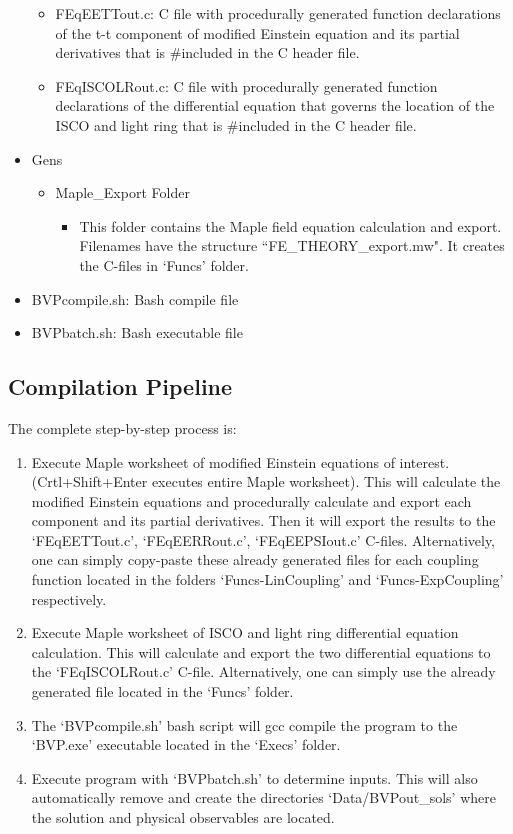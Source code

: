\documentclass{article}
\begin{document}
\begin{itemize}
\begin{itemize}
\item FEqEETTout.c:  C file with procedurally generated function declarations of the t-t component of modified Einstein equation and its partial derivatives that is \#included in the C header file.
\item FEqISCOLRout.c:  C file with procedurally generated function declarations of the differential equation that governs the location of the ISCO and light ring that is \#included in the C header file.
\end{itemize}
\item Gens
\begin{itemize}
\item Maple\_Export Folder
\begin{itemize}
\item This folder contains the Maple field equation calculation and export. Filenames have the structure ``FE\_THEORY\_export.mw". It creates the C-files in `Funcs' folder.
\end{itemize}
\end{itemize}
\item BVPcompile.sh: Bash compile file
\item BVPbatch.sh: Bash executable file
\end{itemize}



\subsection{Compilation Pipeline}
\label{ssec:exec}

The complete step-by-step process is:

\begin{enumerate}
\item Execute Maple worksheet of modified Einstein equations of interest. (Crtl+Shift+Enter executes entire Maple worksheet). This will calculate the modified Einstein equations and procedurally calculate and export each component and its partial derivatives. Then it will export the results to the `FEqEETTout.c', `FEqEERRout.c', `FEqEEPSIout.c' C-files. Alternatively, one can simply copy-paste these already generated files for each coupling function located in the folders `Funcs-LinCoupling' and `Funcs-ExpCoupling' respectively.
\item Execute Maple worksheet of ISCO and light ring differential equation calculation. This will calculate and export the two differential equations to the `FEqISCOLRout.c' C-file. Alternatively, one can simply use the already generated file located in the `Funcs' folder.
\item The `BVPcompile.sh' bash script will gcc compile the program to the `BVP.exe' executable located in the `Execs' folder.
\item Execute program with `BVPbatch.sh' to determine inputs. This will also automatically remove and create the directories `Data/BVPout\_sols' where the solution and physical observables are located.
\end{enumerate}
\end{document}
